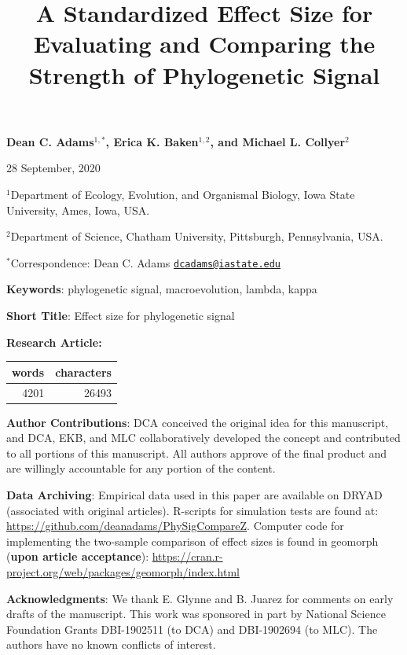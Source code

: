 \documentclass[
]{article}
\title{A Standardized Effect Size for Evaluating and Comparing the Strength of
Phylogenetic Signal}
\author{}
\date{\vspace{-2.5em}}
\begin{document}
\maketitle

\begin{center}
\textbf{Dean C. Adams$^{1,*}$, Erica K. Baken$^{1,2}$, and Michael L. Collyer$^2$}
\end{center}

\begin{center}28 September, 2020\end{center}

\(^{1}\)Department of Ecology, Evolution, and Organismal Biology, Iowa
State University, Ames, Iowa, USA.

\(^{2}\)Department of Science, Chatham University, Pittsburgh,
Pennsylvania, USA.

\(^{*}\)Correspondence: Dean C. Adams
\href{mailto:dcadams@iastate.edu}{\nolinkurl{dcadams@iastate.edu}}
\hfill\break

\textbf{Keywords}: phylogenetic signal, macroevolution, lambda, kappa
\hfill\break

\textbf{Short Title}: Effect size for phylogenetic signal \hfill\break

\textbf{Research Article:}

\begin{longtable}[]{@{}rr@{}}
\toprule
words & characters\tabularnewline
\midrule
\endhead
4201 & 26493\tabularnewline
\bottomrule
\end{longtable}

\textbf{Author Contributions}: DCA conceived the original idea for this
manuscript, and DCA, EKB, and MLC collaboratively developed the concept
and contributed to all portions of this manuscript. All authors approve
of the final product and are willingly accountable for any portion of
the content.\hfill\break

\textbf{Data Archiving}: Empirical data used in this paper are available
on DRYAD (associated with original articles). R-scripts for simulation
tests are found at: \url{https://github.com/deanadams/PhySigCompareZ}.
Computer code for implementing the two-sample comparison of effect sizes
is found in geomorph (\textbf{upon article acceptance}):
\url{https://cran.r-project.org/web/packages/geomorph/index.html}
\hfill\break

\textbf{Acknowledgments}: We thank E. Glynne and B. Juarez for comments
on early drafts of the manuscript. This work was sponsored in part by
National Science Foundation Grants DBI-1902511 (to DCA) and DBI-1902694
(to MLC). The authors have no known conflicts of interest.
\end{document}
